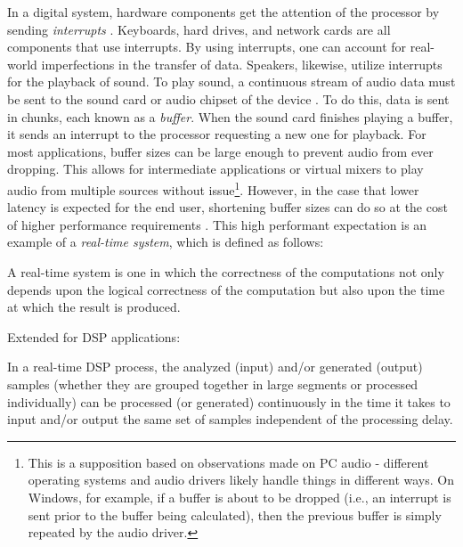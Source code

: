 In a digital system, hardware components get the attention of the processor by sending \textit{interrupts} \cite{Rubini2005-kv}. Keyboards, hard drives, and network cards are all components that use interrupts. By using interrupts, one can account for real-world imperfections in the transfer of data. Speakers, likewise, utilize interrupts for the playback of sound. To play sound, a continuous stream of audio data must be sent to the sound card or audio chipset of the device \cite{Walker_2005}. To do this, data is sent in chunks, each known as a \textit{buffer}. When the sound card finishes playing a buffer, it sends an interrupt to the processor requesting a new one for playback. For most applications, buffer sizes can be large enough to prevent audio from ever dropping. This allows for intermediate applications or virtual mixers to play audio from multiple sources without issue\footnote{This is a supposition based on observations made on PC audio - different operating systems and audio drivers likely handle things in different ways. On Windows, for example, if a buffer is about to be dropped (i.e., an interrupt is sent prior to the buffer being calculated), then the previous buffer is simply repeated by the audio driver.}. However, in the case that lower latency is expected for the end user, shortening buffer sizes can do so at the cost of higher performance requirements \cite{corless2009pc-based}. This high performant expectation is an example of a \textit{real-time system}, which is defined as follows:

\begin{defn}\label{def3}
\hfill \break
A real-time system is one in which the correctness of the computations not
only depends upon the logical correctness of the computation but also upon
the time at which the result is produced.

\begin{center}
\hspace*{-10.8cm}\textnormal{Extended for DSP applications:}
\end{center}

\hspace*{-0.6cm}In a real-time DSP process, the analyzed (input) and/or generated (output)
samples (whether they are grouped together in large segments or processed
individually) can be processed (or generated) continuously in the time it
takes to input and/or output the same set of samples independent of the
processing delay.

\end{defn}

